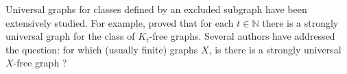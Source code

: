 \documentclass[a4paper,11pt]{article}
\theoremstyle{plain}
\theoremstyle{definition}
\newcommand{\NN}{\mathbb{N}}
\begin{document}

Universal graphs for classes defined by an excluded subgraph have been extensively studied. For example, \citet{Henson71} proved that for each  $t\in\NN$ there is a strongly universal graph for the class of $K_t$-free graphs. Several authors have addressed the question: for which (usually finite) graphs $X$, is there is a strongly universal $X$-free graph \citep{Komjath99,HP84,CS07a,CS16,FK97a,FK97b,CS01,KMP88,KP84,CT07,CSS99}? 




\end{document}

